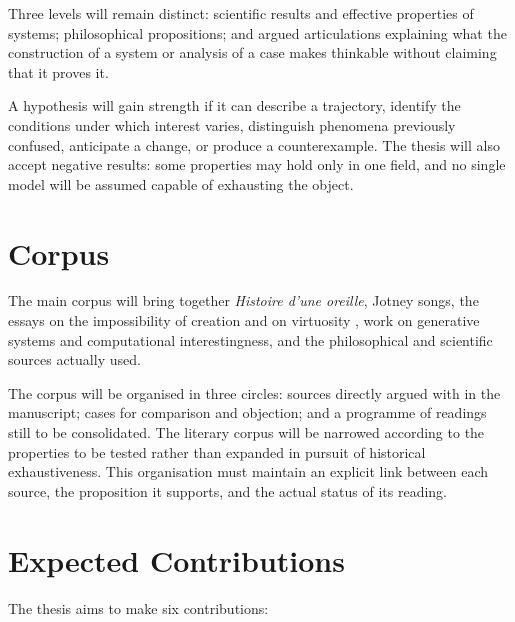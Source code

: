 \documentclass[11pt,a4paper]{article}
\begin{document}
Three levels will remain distinct: scientific results and effective properties
of systems; philosophical propositions; and argued articulations explaining
what the construction of a system or analysis of a case makes thinkable without
claiming that it proves it.

A hypothesis will gain strength if it can describe a trajectory, identify the
conditions under which interest varies, distinguish phenomena previously
confused, anticipate a change, or produce a counterexample. The thesis will also
accept negative results: some properties may hold only in one field, and no
single model will be assumed capable of exhausting the object.

\section{Corpus}

The main corpus will bring together \emph{Histoire d'une oreille}, Jotney songs,
the essays on the impossibility of creation and on virtuosity
\parencite{pachet2018oreille,pachet2026impossibilite,pachet2027virtuosite}, work
on generative systems and computational interestingness, and the philosophical
and scientific sources actually used.

The corpus will be organised in three circles: sources directly argued with in
the manuscript; cases for comparison and objection; and a programme of readings
still to be consolidated. The literary corpus will be narrowed according to the
properties to be tested rather than expanded in pursuit of historical
exhaustiveness. This organisation must maintain an explicit link between each
source, the proposition it supports, and the actual status of its reading.

\section{Expected Contributions}

The thesis aims to make six contributions:
\end{document}
